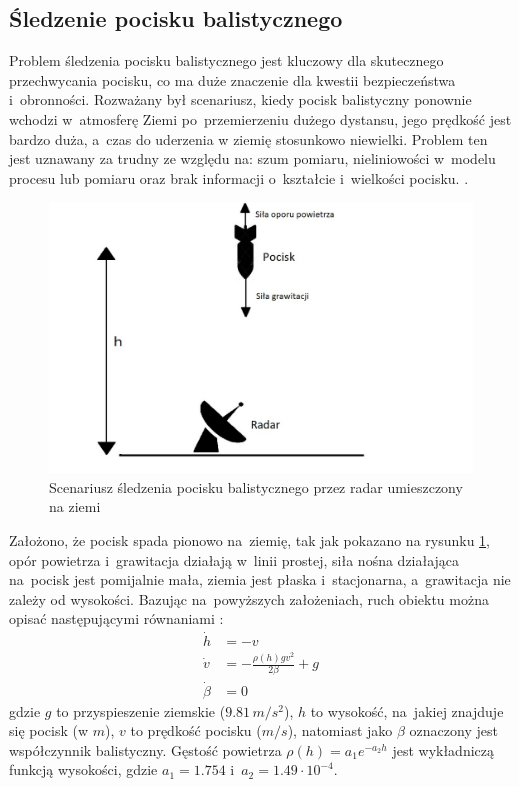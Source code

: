 \subsection{Śledzenie pocisku balistycznego}
\label{subsec:ballistic_target_tracking}
Problem śledzenia pocisku balistycznego jest kluczowy dla skutecznego przechwycania pocisku, co ma duże znaczenie dla kwestii bezpieczeństwa i~obronności. Rozważany był scenariusz, kiedy pocisk balistyczny ponownie wchodzi w~atmosferę Ziemi po~przemierzeniu dużego dystansu, jego prędkość jest bardzo duża, a~czas do uderzenia w ziemię stosunkowo niewielki. Problem ten jest uznawany za trudny ze względu na: szum pomiaru, nieliniowości w~modelu procesu lub pomiaru oraz brak informacji o~kształcie i~wielkości pocisku. \cite{MisslieTracking1}\cite{MissileTracking2}.
\begin{figure}[h!]
	\centering
	\includegraphics[width=0.8\linewidth]{missile_tracking_illustration.jpg}
	\caption{Scenariusz śledzenia pocisku balistycznego przez radar umieszczony na ziemi}
	\label{fig:missile_tracking_illustration}
\end{figure}
\par
Założono, że pocisk spada pionowo na~ziemię, tak jak pokazano na rysunku \ref{fig:missile_tracking_illustration}, opór powietrza i~grawitacja działają w~linii prostej, siła nośna działająca na~pocisk jest pomijalnie mała, ziemia jest płaska i~stacjonarna, a~grawitacja nie zależy od wysokości. Bazując na~powyższych założeniach, ruch obiektu można opisać następującymi równaniami \cite{MissileTrackingEquations}:
\begin{align}\label{eq:missile_tracking_model}
\dot{h} &= -v \nonumber \\
\dot{v} &= - \frac{\rho(h)gv^2}{2\beta} + g \nonumber \\
\dot{\beta} &= 0
\end{align}
gdzie $g$ to przyspieszenie ziemskie ($9.81\,m/s^2$), $h$ to wysokość, na~jakiej znajduje się pocisk (w $m$), $v$ to prędkość pocisku ($m/s$), natomiast jako $\beta$ oznaczony jest współczynnik balistyczny. Gęstość powietrza $\rho(h)=a_1e^{-a_2h}$ jest wykładniczą funkcją wysokości, gdzie $a_1=1.754$ i~$a_2=1.49\cdot10^{-4}$.
